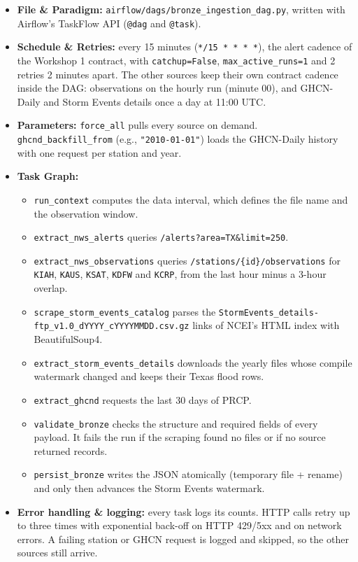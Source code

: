 \documentclass[stu, 12pt, letterpaper, donotrepeattitle, floatsintext, natbib]{apa7}
\begin{document}
\begin{itemize}
    \item \textbf{File \& Paradigm:} \texttt{airflow/dags/bronze\_ingestion\_dag.py}, written with Airflow's TaskFlow API (\texttt{@dag} and \texttt{@task}).
    \item \textbf{Schedule \& Retries:} every 15 minutes (\texttt{*/15 * * * *}), the alert cadence of the Workshop 1 contract, with \texttt{catchup=False}, \texttt{max\_active\_runs=1} and 2 retries 2 minutes apart. The other sources keep their own contract cadence inside the DAG: observations on the hourly run (minute 00), and GHCN-Daily and Storm Events details once a day at 11:00 UTC.
    \item \textbf{Parameters:} \texttt{force\_all} pulls every source on demand. \texttt{ghcnd\_backfill\_from} (e.g., \texttt{"2010-01-01"}) loads the GHCN-Daily history with one request per station and year.
    \item \textbf{Task Graph:}
    \begin{itemize}
        \item \texttt{run\_context} computes the data interval, which defines the file name and the observation window.
        \item \texttt{extract\_nws\_alerts} queries \texttt{/alerts?area=TX\&limit=250}.
        \item \texttt{extract\_nws\_observations} queries \texttt{/stations/\{id\}/observations} for \texttt{KIAH}, \texttt{KAUS}, \texttt{KSAT}, \texttt{KDFW} and \texttt{KCRP}, from the last hour minus a 3-hour overlap.
        \item \texttt{scrape\_storm\_events\_catalog} parses the \texttt{StormEvents\_details-ftp\_v1.0\_dYYYY\_cYYYYMMDD.csv.gz} links of NCEI's HTML index with BeautifulSoup4.
        \item \texttt{extract\_storm\_events\_details} downloads the yearly files whose compile watermark changed and keeps their Texas flood rows.
        \item \texttt{extract\_ghcnd} requests the last 30 days of PRCP.
        \item \texttt{validate\_bronze} checks the structure and required fields of every payload. It fails the run if the scraping found no files or if no source returned records.
        \item \texttt{persist\_bronze} writes the JSON atomically (temporary file + rename) and only then advances the Storm Events watermark.
    \end{itemize}
    \item \textbf{Error handling \& logging:} every task logs its counts. HTTP calls retry up to three times with exponential back-off on HTTP 429/5xx and on network errors. A failing station or GHCN request is logged and skipped, so the other sources still arrive.
\end{itemize}
\end{document}
